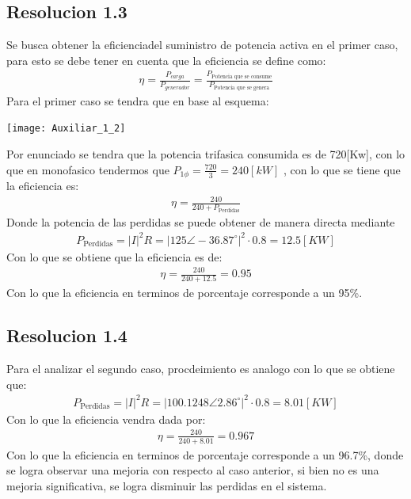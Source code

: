 \documentclass[
  11pt,
  letterpaper,
   addpoints,
   answers
  ]{exam}
\begin{document}
\begin{questions}
\begin{solution}
\subsection*{Resolucion 1.3}
Se busca obtener la eficienciadel suministro de potencia activa en el primer caso, para esto se debe tener en cuenta que la eficiencia se define como:
\begin{align}
    \eta = \frac{P_{carga}}{P_{generador}} =  \frac{P_{\text{Potencia que se consume}}}{P_{\text{Potencia que se genera}}}
\end{align}
Para el primer caso se tendra que en base al esquema:
\begin{center}
    \texttt{[image: Auxiliar\_1\_2]}
  \end{center}
Por enunciado se tendra que la potencia trifasica consumida es de 720[Kw], con lo que en monofasico tendermos que $P_{1\phi} = \frac{720}{3} = 240[kW] $ , con lo que se tiene que la eficiencia es:
\begin{align}
    \eta = \frac{240}{240 + P_{\text{Perdidas}}}
\end{align}
Donde la potencia de las perdidas se puede obtener de manera directa mediante
\begin{align}
    P_{\text{Perdidas}} = |I|^{2}R = |125 \angle -36.87^{\circ}|^{2} \cdot 0.8 = 12.5[KW]
\end{align}
Con lo que se obtiene que la eficiencia es de:
\begin{align}
    \eta = \frac{240}{240 + 12.5} = 0.95
\end{align}
Con lo que la eficiencia en terminos de porcentaje corresponde a un 95\%.
\subsection*{Resolucion 1.4}
Para el analizar el segundo caso, procdeimiento es analogo con lo que se obtiene que:
\begin{align}
    P_{\text{Perdidas}} = |I|^{2}R = |100.1248 \angle 2.86^{\circ}|^{2} \cdot 0.8 = 8.01[KW]
\end{align}
Con lo que la eficiencia vendra dada por:
\begin{align}
    \eta = \frac{240}{240 + 8.01} = 0.967
\end{align}
Con lo que la eficiencia en terminos de porcentaje corresponde a un 96.7\%, donde se logra observar una mejoria con respecto al caso anterior, si bien no es una mejoria significativa, se logra disminuir las perdidas en el sistema.

\end{solution}
\end{questions}
\end{document}

